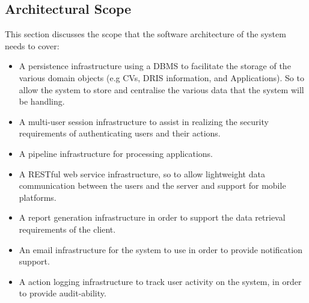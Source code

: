 \documentclass[12pt]{article}
\begin{document}
\subsection{Architectural Scope}
This section discusses the scope that the software architecture of the system needs to cover:
\begin{itemize}
\item A persistence infrastructure using a DBMS to facilitate the storage of the various domain objects (e.g CVs, DRIS information, and Applications). So to allow the system to store and centralise the various data that the system will be handling.
\item A multi-user session infrastructure to assist in realizing the security requirements of authenticating users and their actions.
\item A pipeline infrastructure for processing applications. 
\item A RESTful web service infrastructure, so to allow lightweight data communication between the users and the server and support for mobile platforms.
\item A report generation infrastructure in order to support the data retrieval requirements of the client.
\item An email infrastructure for the system to use in order to provide notification support.
\item A action logging infrastructure to track user activity on the system, in order to provide audit-ability.

\end{itemize}
\end{document}
